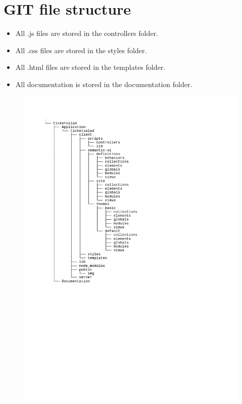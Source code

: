 \documentclass[11pt]{article}
\begin{document}
	\section{GIT file structure}
	\begin{itemize}
		\item All .js files are stored in the controllers folder.
		\item All .css files are stored in the styles folder.
		\item All .html files are stored in the templates folder.
		\item All documentation is stored in the documentation folder.
	\end{itemize}
	\begin{figure}[H]
	\includegraphics[scale=0.5]{tree}
	\end{figure}
	

	
	
	
\end{document}

